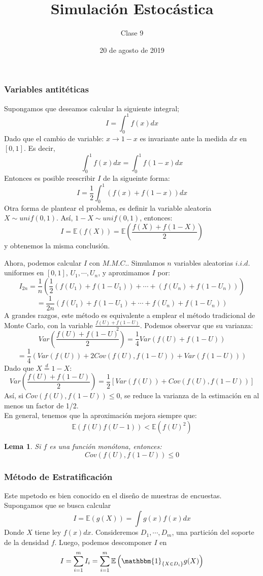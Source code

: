 \documentclass[a4paper]{article}
\title{Simulación Estocástica}
\author{Clase 9}
\date{20 de agosto de 2019}
\newtheorem{lem}{Lema}
\numberwithin{equation}{subsection}
\numberwithin{definicion}{subsection}
\def\E{\mathbb E}
\begin{document}
\maketitle

\subsubsection{Variables antitéticas}
Supongamos que deseamos calcular la siguiente integral;
\[I =   \int_{0}^1 f(x)dx\]
Dado que el cambio de variable: $x\rightarrow 1-x$ es invariante ante la medida $dx$ en $[0,1]$. Es decir,
\[\int_{0}^1f(x)dx = \int_{0}^1f(1-x)dx\]
Entonces es posible reescribir $I$ de la sigueinte forma:
\[I = \frac{1}{2}\int_{0}^1 (f(x) + f(1-x))dx\]
Otra forma de plantear el problema, es definir la variable aleatoria $X\sim unif(0,1)$. Así, $1-X \sim unif(0,1)$, entonces:
\[I = \E(f(X)) = \E\left(\frac{f(X)+f(1-X)}{2}\right)\]
y obtenemos la misma conclusión.\\ \newline

Ahora, podemos calcular $I$ con $M.M.C.$. Simulamos $n$ variables aleatorias $i.i.d.$ uniformes en $[0,1]$, $U_1,\cdots,U_n$, y aproximamos $I$ por:
\[I_{2n} = \frac{1}{n}\left(\frac{1}{2}(f(U_1)+f(1-U_1))+ \cdots + (f(U_n)+f(1-U_n))\right)\]
\[= \frac{1}{2n}(f(U_1)+f(1-U_1) + \cdots + f(U_n) + f(1-U_n))\]
A grandes razgos, este método es equivalente a emplear el método tradicional de Monte Carlo, con la variable $\frac{f(U)+f(1-U)}{2}$. Podemos observar que su varianza:
\[Var\left(\frac{f(U)+f(1-U)}{2}\right) = \frac{1}{4}Var\left(f(U) + f(1-U)\right)\]
\[= \frac{1}{4}\left(Var\left(f(U)\right) + 2Cov\left(f(U),f(1-U)\right) + Var\left(f(1-U)\right)\right)\]
Dado que $X\overset{d}{=}1-X$:
\[Var\left(\frac{f(U)+f(1-U)}{2}\right) = \frac{1}{2}\left[Var(f(U)) + Cov(f(U),f(1-U))\right]\]
Así, si $Cov(f(U),f(1-U)) \leq 0$, se reduce la varianza de la estimación en al menos un factor de 1/2.\\ \newline
En general, tenemos que la aproximación mejora siempre que:
\[\E\left(f(U)f(U-1)\right) < \E\left(f(U)^2\right)\]

\begin{lem} Si $f$ es una función \textit{monótona}, entonces:
\[Cov(f(U),f(1-U)) \leq0\]
\end{lem}
\subsubsection{Método de Estratificación}
Este mpetodo es bien conocido en el diseño de muestras de encuestas. Supongamos que se busca calcular
\[I = \E\left(g(X)\right) = \int g(x)f(x)dx\]
Donde $X$ tiene ley $f(x)dx$. Consideremos $D_1,\cdots,D_m$, una partición del soporte de la densidad $f$. Luego, podemos descomponer $I$ en
\begin{equation}
    I = \sum_{i=1}^m I_i = \sum_{i=1}^m \E\left(\mathbbm{1}_{\{X\in D_i\}}g(X)\right)
    \label{eq_estrat1}
\end{equation}
\end{document}
